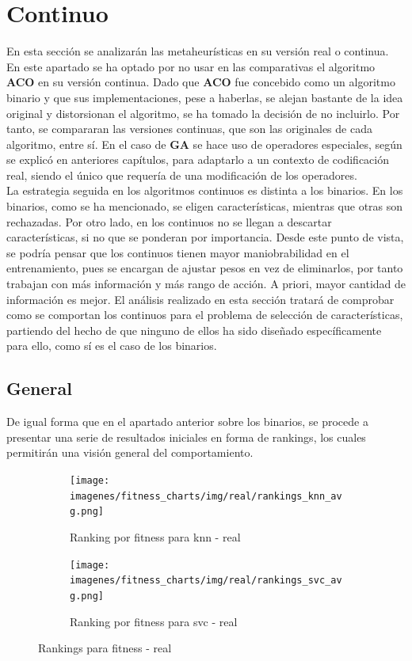\section{Continuo}
En esta sección se analizarán las metaheurísticas en su versión real o continua. En este apartado se ha optado por no usar en las comparativas el algoritmo \textbf{ACO} en su versión continua. Dado que \textbf{ACO} fue concebido como un algoritmo binario y que sus implementaciones, pese a haberlas, se alejan bastante de la idea original y distorsionan el algoritmo, se ha tomado la decisión de no incluirlo. Por tanto, se compararan las versiones continuas, que son las originales de cada algoritmo, entre sí. En el caso de \textbf{GA} se hace uso de operadores especiales, según se explicó en anteriores capítulos, para adaptarlo a un contexto de codificación real, siendo el único que requería de una modificación de los operadores.\\[6pt]
La estrategia seguida en los algoritmos continuos es distinta a los binarios. En los binarios, como se ha mencionado, se eligen características, mientras que otras son rechazadas. Por otro lado, en los continuos no se llegan a descartar características, si no que se ponderan por importancia. Desde este punto de vista, se podría pensar que los continuos tienen mayor maniobrabilidad en el entrenamiento, pues se encargan de ajustar pesos en vez de eliminarlos, por tanto trabajan con más información y más rango de acción. A priori, mayor cantidad de información es mejor. El análisis realizado en esta sección tratará de comprobar como se comportan los continuos para el problema de selección de características, partiendo del hecho de que ninguno de ellos ha sido diseñado específicamente para ello, como sí es el caso de los binarios.

\subsection{General}
De igual forma que en el apartado anterior sobre los binarios, se procede a presentar una serie de resultados iniciales en forma de rankings, los cuales permitirán una visión general del comportamiento.

\begin{figure}[htp]
    \centering
    \begin{subfigure}[htp]{1\textwidth}
        \texttt{[image: imagenes/fitness\_charts/img/real/rankings\_knn\_avg.png]}
        \caption{Ranking por fitness para knn - real}
        \label{fig:ranking_knn_real}
    \end{subfigure}
    \begin{subfigure}[htp]{1\textwidth}
        \texttt{[image: imagenes/fitness\_charts/img/real/rankings\_svc\_avg.png]}
        \caption{Ranking por fitness para svc - real}
        \label{fig:ranking_svc_real}
    \end{subfigure}
    \caption{Rankings para fitness - real}
\end{figure}

